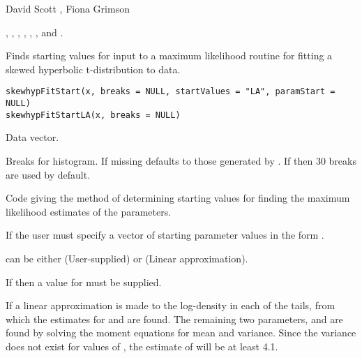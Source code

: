 \documentclass{book}
\begin{document}
\begin{Author}\relax
David Scott , Fiona Grimson
\end{Author}
\begin{SeeAlso}\relax
{}, , ,
, ,
,
 and .
\end{SeeAlso}

\begin{Description}\relax
Finds starting values for input to a maximum likelihood routine for
fitting a skewed hyperbolic t-distribution to data.
\end{Description}
\begin{Usage}
\begin{verbatim}
skewhypFitStart(x, breaks = NULL, startValues = "LA", paramStart = NULL)
skewhypFitStartLA(x, breaks = NULL)
\end{verbatim}
\end{Usage}
\begin{Arguments}
\begin{ldescription}
\item[\code{x}] Data vector.
\item[\code{breaks}] Breaks for histogram. If missing defaults to those
generated by . If
 then 30 breaks are used by default.
\item[\code{startValues}] Code giving the method of determining starting
values for finding the maximum likelihood estimates of the
parameters.
\item[\code{paramStart}] If  the user must specify a
vector of starting parameter values in the form .
\end{ldescription}
\end{Arguments}
\begin{Details}\relax
{} can be either (User-supplied) or
 (Linear approximation).

If  then a value for  must be
supplied.

If  a linear approximation is made to the
log-density in each of the tails, from which the estimates for
 and  are found. The remaining two
parameters,  and  are found by solving
the moment equations for mean and variance.
Since the variance does not exist for values of , the estimate of  will be at least 4.1.
\end{Details}
\end{document}
